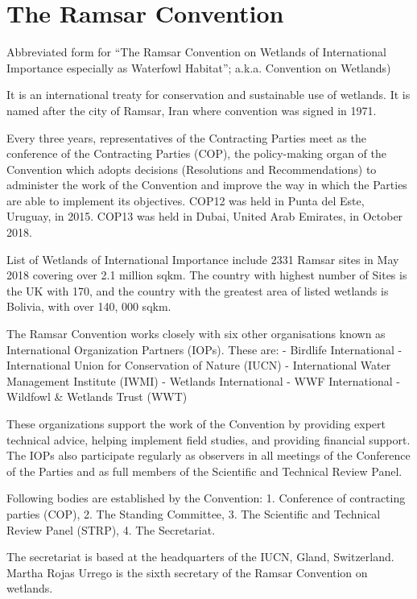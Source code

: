 \documentclass[
  openany]{book}
\begin{document}
\hypertarget{the-ramsar-convention}{%
\section{The Ramsar Convention}\label{the-ramsar-convention}}

Abbreviated form for ``The Ramsar Convention on Wetlands of International Importance especially as Waterfowl Habitat''; a.k.a. Convention on Wetlands)

It is an international treaty for conservation and sustainable use of wetlands. It is named after the city of Ramsar, Iran where convention was signed in 1971.

Every three years, representatives of the Contracting Parties meet as the conference of the Contracting Parties (COP), the policy-making organ of the Convention which adopts decisions (Resolutions and Recommendations) to administer the work of the Convention and improve the way in which the Parties are able to implement its objectives. COP12 was held in Punta del Este, Uruguay, in 2015. COP13 was held in Dubai, United Arab Emirates, in October 2018.

List of Wetlands of International Importance include 2331 Ramsar sites in May 2018 covering over 2.1 million sqkm. The country with highest number of Sites is the UK with 170, and the country with the greatest area of listed wetlands is Bolivia, with over 140, 000 sqkm.

The Ramsar Convention works closely with six other organisations known as International Organization Partners (IOPs). These are:
- Birdlife International
- International Union for Conservation of Nature (IUCN)
- International Water Management Institute (IWMI)
- Wetlands International
- WWF International
- Wildfowl \& Wetlands Trust (WWT)

These organizations support the work of the Convention by providing expert technical advice, helping implement field studies, and providing financial support. The IOPs also participate regularly as observers in all meetings of the Conference of the Parties and as full members of the Scientific and Technical Review Panel.

Following bodies are established by the Convention: 1. Conference of contracting parties (COP), 2. The Standing Committee, 3. The Scientific and Technical Review Panel (STRP), 4. The Secretariat.

The secretariat is based at the headquarters of the IUCN, Gland, Switzerland. Martha Rojas Urrego is the sixth secretary of the Ramsar Convention on wetlands.
\end{document}
